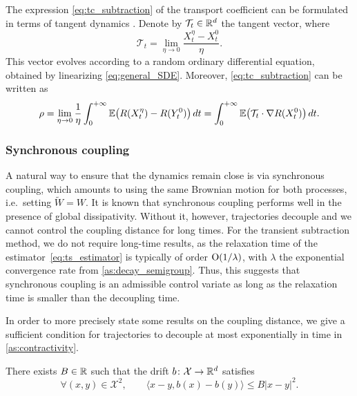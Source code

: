 \begin{remark}
%
The expression \eqref{eq:tc_subtraction} of the transport coefficient can be formulated in terms of tangent dynamics \cite{assaraf2017}. Denote by $\mathcal{T}_t\in\mathbb{R}^d$ the tangent vector, where
%
\begin{equation}
	\mathcal{T}_t 
	= \lim_{\eta\to 0} \frac{X_t^\eta - X_t^0}{\eta}.
\end{equation} 
%
This vector evolves according to a random ordinary differential equation, obtained by linearizing \eqref{eq:general_SDE}. Moreover,
\eqref{eq:tc_subtraction} can be written as
%
\begin{equation}
	\rho = \lim_{\eta\to 0} \frac{1}{\eta}\int_0^{+\infty} \E\paren*{R(X_t^\eta) - R(Y_t^0)} \, dt = \int_0^{+\infty} \E\paren*{\mathcal{T}_t\cdot \nabla R(X_t^0)} \, dt.
\end{equation}
%
\end{remark}

\subsubsection{Synchronous coupling}
\label{subsubsec:synchronous_coup}
%
A natural way to ensure that the dynamics remain close is via synchronous coupling, which amounts to using the same Brownian motion for both processes, i.e.\ setting $\widetilde{W} = W$. It is known that synchronous coupling performs well in the presence of global dissipativity. Without it, however, trajectories decouple and we cannot control the coupling distance for long times. For the transient subtraction method, we do not require long-time results, as the relaxation time of the estimator~\eqref{eq:ts_estimator} is typically of order $\mathrm{O}(1/\lambda)$, with $\lambda$ the exponential convergence rate from \cref{as:decay_semigroup}. Thus, this suggests that synchronous coupling is an admissible control variate as long as the relaxation time is smaller than the decoupling time.

In order to more precisely state some results on the coupling distance, we give a sufficient condition for trajectories to decouple at most exponentially in time in \cref{as:contractivity}. %
 
\begin{assumption}
\label{as:contractivity}
	There exists $B\in\mathbb{R}$ such that the drift $b\colon \mathcal{X} \to \mathbb{R}^d$ satisfies
	\begin{equation}
		\forall (x,y) \in \mathcal{X}^2, \qquad \langle x-y, b(x)-b(y)\rangle \leq B|x-y|^2.
		\label{eq:no_dissip}
	\end{equation}
	
\end{assumption}

